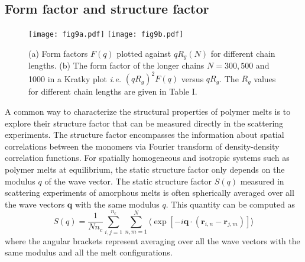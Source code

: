 \documentclass[pre,showpacs,notitlepage,twocolumn]{revtex4-1}
\begin{document}
 


 








\subsection*{ Form factor and  structure  factor}
%
\begin{figure*}[t]
\texttt{[image: fig9a.pdf]}
\texttt{[image: fig9b.pdf]}
\caption{%
(a) Form factors $F(q)$ plotted against $qR_g(N)$ for different chain lengths. (b) The form factor of the longer chains $N=300,500$ and 1000  in a Kratky plot  {\it i.e.} $(qR_g)^2 F(q)$ 
versus $qR_g$. The $R_g$ values for different chain lengths are given in Table I.
   }
\label{fig9} 
\end{figure*}

A  common way to characterize the structural  properties of polymer melts is to explore their  structure factor that can be measured directly in the scattering experiments.
The structure factor encompasses the information about spatial correlations between the monomers via Fourier transform of  density-density correlation functions.    For spatially homogeneous and isotropic 
systems such as polymer melts at equilibrium, the static structure factor only depends on the modulus $q$ of the wave vector.
The static structure factor $S(q)$  measured in scattering experiments of amorphous melts  is  often spherically averaged over all the wave vectors $\mathbf{q}$ with the  same modulus $q$.  This quantity can be
computed as 
%
\begin{equation}
S(q)=\frac{1}{N n_c} \sum_{i,j=1}^{n_c} \sum_{n,m=1}^{N} \langle \exp \left[-i \mathbf{q} \cdot (\mathbf{r}_{i,n} -\mathbf{r}_{j,m}) \right] \rangle
\label{eq:SQ0}
 \end{equation}
%
where the angular brackets represent  averaging over all the wave vectors with the same modulus and all the melt configurations. 
\end{document}
